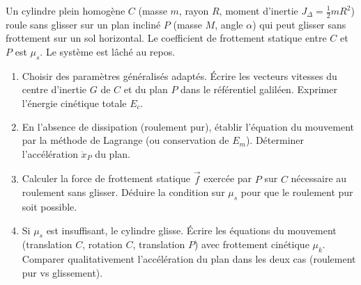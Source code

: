 \documentclass[11pt]{article}
\begin{document}
\begin{exercice}
Un cylindre plein homogène $C$ (masse $m$, rayon $R$, moment d'inertie $J_\Delta = \frac{1}{2}mR^2$) roule sans glisser sur un plan incliné $P$ (masse $M$, angle $\alpha$) qui peut glisser sans frottement sur un sol horizontal. Le coefficient de frottement statique entre $C$ et $P$ est $\mu_s$. Le système est lâché au repos.
\begin{enumerate}
    \item Choisir des paramètres généralisés adaptés. Écrire les vecteurs vitesses du centre d'inertie $G$ de $C$ et du plan $P$ dans le référentiel galiléen. Exprimer l'énergie cinétique totale $E_c$.
    \item En l'absence de dissipation (roulement pur), établir l'équation du mouvement par la méthode de Lagrange (ou conservation de $E_m$). Déterminer l'accélération $\ddot{x}_P$ du plan.
    \item Calculer la force de frottement statique $\vec{f}$ exercée par $P$ sur $C$ nécessaire au roulement sans glisser. Déduire la condition sur $\mu_s$ pour que le roulement pur soit possible.
    \item Si $\mu_s$ est insuffisant, le cylindre glisse. Écrire les équations du mouvement (translation $C$, rotation $C$, translation $P$) avec frottement cinétique $\mu_k$. Comparer qualitativement l'accélération du plan dans les deux cas (roulement pur vs glissement).
\end{enumerate}
\end{exercice}
\end{document}
